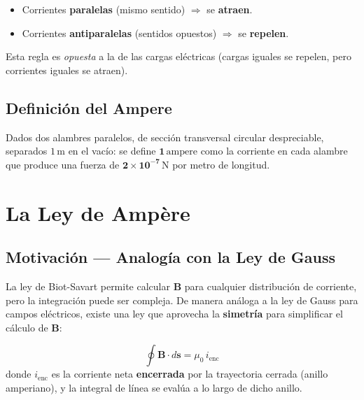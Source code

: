 \documentclass[12pt, letterpaper]{report}
\numberwithin{equation}{section}
\newcommand{\vB}[1]{\boldsymbol{#1}}          %
\newcommand{\un}[1]{\,\mathrm{#1}}            %
\begin{document}
\begin{tcolorbox}[propbox, title=Regla general de interacción entre corrientes]
  \begin{itemize}[leftmargin=1.5em, itemsep=2pt]
    \item Corrientes \textbf{paralelas} (mismo sentido)
          $\Rightarrow$ se \textbf{atraen}.
    \item Corrientes \textbf{antiparalelas} (sentidos opuestos)
          $\Rightarrow$ se \textbf{repelen}.
  \end{itemize}
  Esta regla es \textit{opuesta} a la de las cargas eléctricas
  (cargas iguales se repelen, pero corrientes iguales se atraen).
\end{tcolorbox}

\subsection{Definición del Ampere}

\begin{tcolorbox}[defbox, title=Definición SI del ampere]
  Dados dos alambres paralelos, de sección transversal circular
  despreciable, separados $1\un{m}$ en el vacío: se define
  $\mathbf{1\un{ampere}}$ como la corriente en cada alambre que
  produce una fuerza de $\mathbf{2\times10^{-7}\un{N}}$ por metro
  de longitud.
\end{tcolorbox}

\section{La Ley de Amp\`{e}re}

\subsection{Motivación — Analogía con la Ley de Gauss}

La ley de Biot-Savart permite calcular $\vB{B}$ para cualquier
distribución de corriente, pero la integración puede ser compleja.
De manera análoga a la ley de Gauss para campos eléctricos, existe
una ley que aprovecha la \textbf{simetría} para simplificar el
cálculo de $\vB{B}$:

\begin{tcolorbox}[defbox, title=Ley de Amp\`{e}re]
  \begin{equation}
    \boxed{\oint\vB{B}\cdot d\vB{s} = \mu_0\, i_\text{enc}}
    \label{eq:Ampere}
  \end{equation}
  donde $i_\text{enc}$ es la corriente neta \textbf{encerrada} por
  la trayectoria cerrada (anillo amperiano), y la integral de línea
  se evalúa a lo largo de dicho anillo.
\end{tcolorbox}
\end{document}
